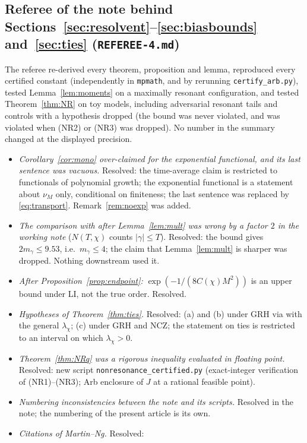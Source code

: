 \documentclass[11pt]{amsart}
\theoremstyle{definition}
\numberwithin{equation}{section}
\begin{document}
\subsection*{Referee of the note behind
Sections~\ref{sec:resolvent}--\ref{sec:biasbounds}
and~\ref{sec:ties} (\texttt{REFEREE-4.md})}
The referee re-derived every theorem, proposition and lemma,
reproduced every certified constant (independently in
\texttt{mpmath}, and by rerunning \texttt{certify\_arb.py}), tested
Lemma~\ref{lem:moments} on a maximally resonant configuration, and
tested Theorem~\ref{thm:NR} on toy models, including adversarial
resonant tails and controls with a hypothesis dropped (the bound was
never violated, and was violated when (NR2) or (NR3) was dropped). No
number in the summary changed at the displayed precision.
\begin{itemize}
\item[R1.] \emph{Corollary~\ref{cor:mono} over-claimed for the
exponential functional, and its last sentence was vacuous.}
Resolved: the time-average claim is restricted to functionals of
polynomial growth; the exponential functional is a statement about
$\nu_M$ only, conditional on finiteness; the last sentence was
replaced by \eqref{eq:transport}. Remark~\ref{rem:noexp} was added.
\item[R2.] \emph{The comparison with \cite{BMOR21} after
Lemma~\ref{lem:mult} was wrong by a factor $2$ in the working note}
($N(T,\chi)$ counts $|\gamma|\le T$). Resolved: the bound gives
$2m_\gamma\le9.53$, i.e.\ $m_\gamma\le4$; the claim that
Lemma~\ref{lem:mult} is sharper was dropped. Nothing downstream used
it.
\item[R3.] \emph{After Proposition~\ref{prop:endpoint}:}
$\exp(-1/(8C(\chi)M^2))$ is an upper bound under LI, not the true
order. Resolved.
\item[R4.] \emph{Hypotheses of Theorem~\ref{thm:ties}.} Resolved: (a)
and (b) under GRH via \cite[Theorem~A]{MC} with the general
$\lambda_\chi$; (c) under GRH and NCZ; the statement on ties is
restricted to an interval on which $\lambda_\chi>0$.
\item[R5.] \emph{Theorem~\ref{thm:NRq} was a rigorous inequality
evaluated in floating point.} Resolved: new script
\texttt{nonresonance\_certified.py} (exact-integer verification of
(NR1)--(NR3); Arb enclosure of $J$ at a rational feasible point).
\item[R6.] \emph{Numbering inconsistencies between the note and its
scripts.} Resolved in the note; the numbering of the present article
is its own.
\item[R7.] \emph{Citations of Martin--Ng.} Resolved:

\end{itemize}
\end{document}
